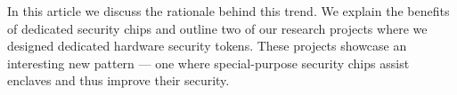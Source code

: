 In this article we discuss the rationale behind this trend. We explain the benefits of dedicated security chips and outline two of our research projects where we designed dedicated hardware security tokens. These projects showcase an interesting new pattern --- one where special-purpose security chips assist enclaves and thus improve their security. 
